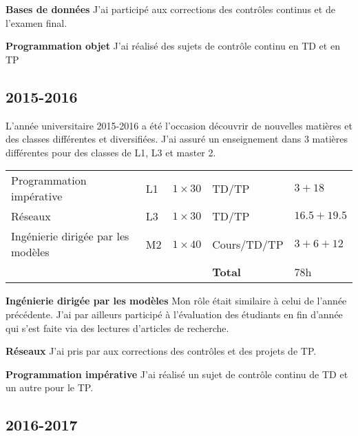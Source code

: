 {\bf Bases de données} J'ai participé aux corrections des contrôles continus et de l'examen final.
 
{\bf Programmation objet} J'ai réalisé des sujets de contrôle continu en TD et en TP

\subsection{2015-2016}

L'année universitaire 2015-2016 a été l'occasion découvrir de nouvelles matières et des classes différentes et diversifiées. J'ai assuré un enseignement dans 3 matières différentes pour des classes de L1, L3 et master 2.

\begin{tabular}{m{5cm}||m{1.3cm}m{1.5cm}m{2.5cm}m{3cm}} 
\hline
Programmation impérative           & L1 & $1\times30$ & TD/TP & $3+18$ \\
Réseaux                            & L3 & $1\times30$ & TD/TP & $16.5 + 19.5$ \\
Ingénierie dirigée par les modèles & M2 & $1\times40$ & Cours/TD/TP & $3+6+12$ \\
\cline{4-5}
 & & & {\bf Total} & $78$h \\
\hline
\end{tabular} 

{\bf Ingénierie dirigée par les modèles} Mon rôle était similaire à celui de l'année précédente. J'ai par ailleurs participé à l'évaluation des étudiants en fin d'année qui s'est faite via des lectures d'articles de recherche.

{\bf Réseaux} J'ai pris par aux corrections des contrôles et des projets de TP.

{\bf Programmation impérative} J'ai réalisé un sujet de contrôle continu de TD et un autre pour le TP.

\subsection{2016-2017}

